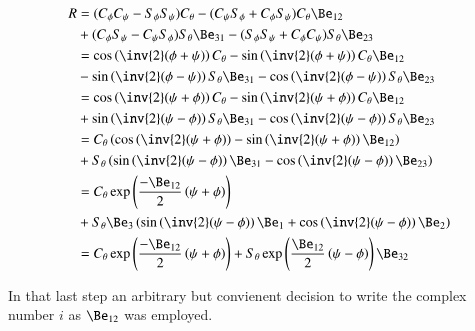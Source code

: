 \documentclass{article}
\begin{document}
\begin{align*}
R 
&=
( C_\phi C_\psi - S_\phi S_\psi ) C_\theta 
- ( C_\psi S_\phi + C_\phi S_\psi ) C_\theta \Be_{12} \\
&+ ( C_\phi S_\psi - C_\psi S_\phi ) S_\theta \Be_{31} 
- ( S_\phi S_\psi + C_\phi C_\psi ) S_\theta \Be_{23}  \\
&=
\cos\left(\inv{2}(\phi+\psi)\right) C_\theta 
-\sin\left(\inv{2}(\phi + \psi)\right) C_\theta \Be_{12} \\
&- \sin\left(\inv{2}(\phi - \psi)\right) S_\theta \Be_{31} 
- \cos\left(\inv{2}(\phi - \psi)\right) S_\theta \Be_{23} \\
&=
\cos\left(\inv{2}(\psi+\phi)\right) C_\theta 
-\sin\left(\inv{2}(\psi + \phi)\right) C_\theta \Be_{12} \\
&+ \sin\left(\inv{2}(\psi - \phi)\right) S_\theta \Be_{31} 
- \cos\left(\inv{2}(\psi - \phi)\right) S_\theta \Be_{23} \\
&=
C_\theta \left(
\cos\left(\inv{2}(\psi+\phi)\right) 
-\sin\left(\inv{2}(\psi + \phi)\right) \Be_{12} 
\right) \\
&+ 
S_\theta \left(
\sin\left(\inv{2}(\psi - \phi)\right) 
\Be_{31} 
- \cos\left(\inv{2}(\psi - \phi)\right) \Be_{23} \right) \\
&=
C_\theta 
\exp\left(
\frac{- \Be_{12} }{2}\left(\psi+\phi\right) 
\right)
\\
&+ 
S_\theta \Be_{3} 
\left(
\sin\left(\inv{2}(\psi - \phi)\right) 
\Be_{1} 
+ \cos\left(\inv{2}(\psi - \phi)\right) \Be_{2} \right) \\
&=
C_\theta 
\exp\left(
\frac{- \Be_{12} }{2}\left(\psi+\phi\right) 
\right)
+ 
S_\theta
\exp\left(
\frac{\Be_{12} }{2}\left(\psi-\phi\right) 
\right)
\Be_{32} \\
\end{align*}

In that last step an arbitrary but convienent decision to write the complex number $i$ as $\Be_{12}$ was employed.



\end{document}
